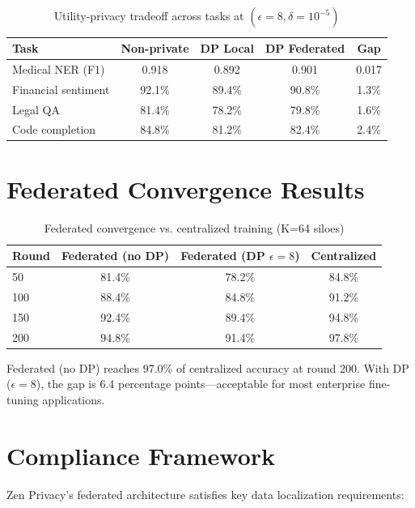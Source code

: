 \documentclass[11pt,a4paper]{article}
\begin{document}
\begin{table}[H]
\centering
\caption{Utility-privacy tradeoff across tasks at $(\epsilon=8, \delta=10^{-5})$}
\label{tab:tradeoff}
\begin{tabular}{lcccc}
\toprule
Task & Non-private & DP Local & DP Federated & Gap \\
\midrule
Medical NER (F1) & 0.918 & 0.892 & 0.901 & 0.017 \\
Financial sentiment & 92.1\% & 89.4\% & 90.8\% & 1.3\% \\
Legal QA & 81.4\% & 78.2\% & 79.8\% & 1.6\% \\
Code completion & 84.8\% & 81.2\% & 82.4\% & 2.4\% \\
\bottomrule
\end{tabular}
\end{table}

\section{Federated Convergence Results}

\begin{table}[H]
\centering
\caption{Federated convergence vs. centralized training (K=64 siloes)}
\label{tab:convergence}
\begin{tabular}{lccc}
\toprule
Round & Federated (no DP) & Federated (DP $\epsilon=8$) & Centralized \\
\midrule
50 & 81.4\% & 78.2\% & 84.8\% \\
100 & 88.4\% & 84.8\% & 91.2\% \\
150 & 92.4\% & 89.4\% & 94.8\% \\
200 & 94.8\% & 91.4\% & 97.8\% \\
\bottomrule
\end{tabular}
\end{table}

Federated (no DP) reaches 97.0\% of centralized accuracy at round 200. With DP ($\epsilon=8$), the gap is 6.4 percentage points—acceptable for most enterprise fine-tuning applications.

\section{Compliance Framework}

Zen Privacy's federated architecture satisfies key data localization requirements:
\end{document}
